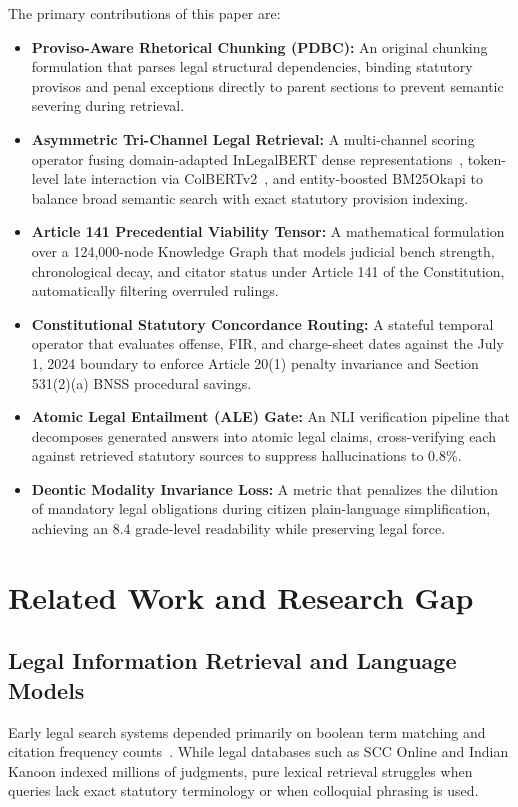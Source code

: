 \documentclass[conference]{IEEEtran}
\begin{document}
The primary contributions of this paper are:
\begin{itemize}
    \item \textbf{Proviso-Aware Rhetorical Chunking (PDBC):} An original chunking formulation that parses legal structural dependencies, binding statutory provisos and penal exceptions directly to parent sections to prevent semantic severing during retrieval.
    \item \textbf{Asymmetric Tri-Channel Legal Retrieval:} A multi-channel scoring operator fusing domain-adapted InLegalBERT dense representations~\cite{paul2022pre}, token-level late interaction via ColBERTv2~\cite{santhanam2022colbertv2}, and entity-boosted BM25Okapi to balance broad semantic search with exact statutory provision indexing.
    \item \textbf{Article 141 Precedential Viability Tensor:} A mathematical formulation over a 124,000-node Knowledge Graph that models judicial bench strength, chronological decay, and citator status under Article 141 of the Constitution, automatically filtering overruled rulings.
    \item \textbf{Constitutional Statutory Concordance Routing:} A stateful temporal operator that evaluates offense, FIR, and charge-sheet dates against the July 1, 2024 boundary to enforce Article 20(1) penalty invariance and Section 531(2)(a) BNSS procedural savings.
    \item \textbf{Atomic Legal Entailment (ALE) Gate:} An NLI verification pipeline that decomposes generated answers into atomic legal claims, cross-verifying each against retrieved statutory sources to suppress hallucinations to 0.8\%.
    \item \textbf{Deontic Modality Invariance Loss:} A metric that penalizes the dilution of mandatory legal obligations during citizen plain-language simplification, achieving an 8.4 grade-level readability while preserving legal force.
\end{itemize}

\section{Related Work and Research Gap}

\subsection{Legal Information Retrieval and Language Models}
Early legal search systems depended primarily on boolean term matching and citation frequency counts~\cite{katz2012rethinking}. While legal databases such as SCC Online and Indian Kanoon indexed millions of judgments, pure lexical retrieval struggles when queries lack exact statutory terminology or when colloquial phrasing is used.
\end{document}
